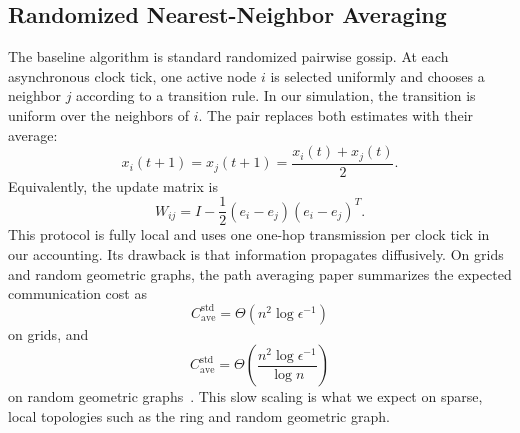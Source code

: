 \documentclass[conference]{IEEEtran}
\begin{document}
\subsection{Randomized Nearest-Neighbor Averaging}
The baseline algorithm is standard randomized pairwise gossip. At each asynchronous clock tick, one active node $i$ is selected uniformly and chooses a neighbor $j$ according to a transition rule. In our simulation, the transition is uniform over the neighbors of $i$. The pair replaces both estimates with their average:
\begin{equation}
    x_i(t+1)=x_j(t+1)=\frac{x_i(t)+x_j(t)}{2}.
\end{equation}
Equivalently, the update matrix is
\begin{equation}
    W_{ij}=I-\frac{1}{2}(e_i-e_j)(e_i-e_j)^T.
\end{equation}
This protocol is fully local and uses one one-hop transmission per clock tick in our accounting. Its drawback is that information propagates diffusively. On grids and random geometric graphs, the path averaging paper summarizes the expected communication cost as
\begin{equation}
    C_{\mathrm{ave}}^{\mathrm{std}}
    = \Theta(n^2\log\epsilon^{-1})
\end{equation}
on grids, and
\begin{equation}
    C_{\mathrm{ave}}^{\mathrm{std}}
    = \Theta\left(\frac{n^2\log\epsilon^{-1}}{\log n}\right)
\end{equation}
on random geometric graphs~\cite{benezit2008order}. This slow scaling is what we expect on sparse, local topologies such as the ring and random geometric graph.
\end{document}
